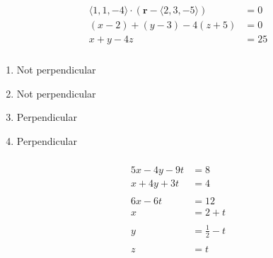 \documentclass{article}
\begin{document}
\setcounter{subsubsection}{50}
\subsubsection{}

\begin{align*}
  \langle 1, 1, -4 \rangle \cdot (\mathbf{r} - \langle 2, 3, -5 \rangle) & = 0  \\
  (x - 2) + (y - 3) - 4 (z + 5)                                          & = 0  \\
  x + y - 4 z                                                            & = 25
\end{align*}

\setcounter{subsubsection}{62}
\subsubsection{}

\begin{enumerate}
  \item Not perpendicular

  \item Not perpendicular

  \item Perpendicular

  \item Perpendicular
\end{enumerate}

\setcounter{subsubsection}{64}
\subsubsection{}

\begin{align*}
  5 x - 4 y - 9 t & = 8               \\
  x + 4 y + 3 t   & = 4               \\ \\
  6 x - 6 t       & = 12              \\
  x               & = 2 + t           \\ \\
  y               & = \frac{1}{2} - t \\ \\
  z               & = t
\end{align*}

\setcounter{subsubsection}{68}
\subsubsection{}
\end{document}
